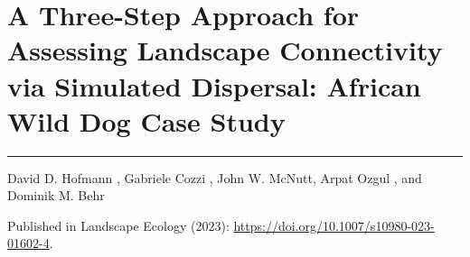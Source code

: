 \documentclass[../FinalThesis.tex]{subfiles}
\begin{document}
\chapter{A Three-Step Approach for Assessing Landscape Connectivity via
Simulated Dispersal: African Wild Dog Case Study}
\label{ChapterSimulation}
\thispagestyle{empty}
\vspace{-1cm}
\noindent\hfil\rule{0.75\textwidth}{.4pt}\hfil

\begin{center}
David D. Hofmann ,
Gabriele Cozzi ,
John W. McNutt,
Arpat Ozgul , and
Dominik M. Behr 


\vfill

Published in Landscape Ecology (2023):
\url{https://doi.org/10.1007/s10980-023-01602-4}.

%
%
%
%

\end{center}


%
%


\newpage
\end{document}
